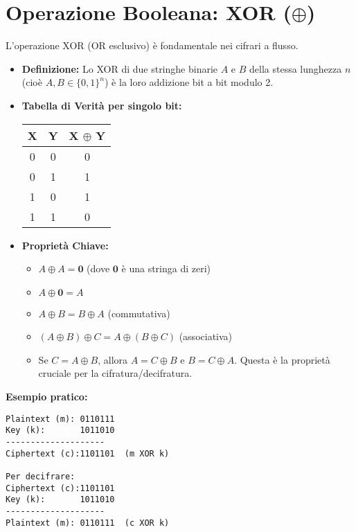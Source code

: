 \section{Operazione Booleana: XOR ($\oplus$)}
L'operazione XOR (OR esclusivo) è fondamentale nei cifrari a flusso.
\begin{itemize}
    \item \textbf{Definizione:} Lo XOR di due stringhe binarie $A$ e $B$ della stessa lunghezza $n$ (cioè $A, B \in \{0,1\}^n$) è la loro addizione bit a bit modulo 2.
    \item \textbf{Tabella di Verità per singolo bit:}
    \begin{center}
    \begin{tabular}{|c|c|c|}
        \hline
        \textbf{X} & \textbf{Y} & \textbf{X $\boldsymbol{\oplus}$ Y} \\
        \hline
        0 & 0 & 0 \\
        0 & 1 & 1 \\
        1 & 0 & 1 \\
        1 & 1 & 0 \\
        \hline
    \end{tabular}
    \end{center}
    \item \textbf{Proprietà Chiave:}
    \begin{itemize}
        \item $A \oplus A = \mathbf{0}$ (dove $\mathbf{0}$ è una stringa di zeri)
        \item $A \oplus \mathbf{0} = A$
        \item $A \oplus B = B \oplus A$ (commutativa)
        \item $(A \oplus B) \oplus C = A \oplus (B \oplus C)$ (associativa)
        \item Se $C = A \oplus B$, allora $A = C \oplus B$ e $B = C \oplus A$. Questa è la proprietà cruciale per la cifratura/decifratura.
    \end{itemize}
\end{itemize}
\textbf{Esempio pratico:}
\begin{verbatim}
Plaintext (m): 0110111
Key (k):       1011010
--------------------
Ciphertext (c):1101101  (m XOR k)

Per decifrare:
Ciphertext (c):1101101
Key (k):       1011010
--------------------
Plaintext (m): 0110111  (c XOR k)
\end{verbatim}

